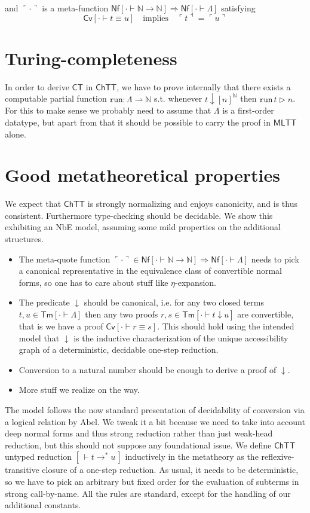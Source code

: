 \documentclass{article}
\newcommand{\MLTT}{\ensuremath{\mathsf{MLTT}}}
\newcommand{\CT}{\ensuremath{\mathsf{CT}}}
\newcommand{\CTTT}{\ensuremath{\mathsf{ChTT}}}
\newcommand{\Trm}[2]{\mathsf{Tm}[{{#1} \vdash {#2}}]}
\newcommand{\TNf}[2]{ {\mathsf{Nf}}[{{#1} \vdash {#2}}]}
\newcommand{\TEq}[3]{ {\mathsf{Cv}}[{{#1} \vdash {#2} \equiv {#3}}]}
\newcommand{\TRed}[2]{{[\, \vdash {#1} \longrightarrow^* {#2}\,]}}
\newcommand{\Code}{\Lambda}
\newcommand{\TNat}{\mathbb{N}}
\newcommand{\QNf}[1]{{\ulcorner{#1}\urcorner}}
\newcommand{\CRed}{\mathrel{\downarrow}}
\newcommand{\Reif}[2]{{[#1]}^{#2}}
\begin{document}
\noindent and $\QNf{\cdot}$ is a meta-function $\TNf{\cdot}{\TNat\rightarrow\TNat} \Rightarrow \TNf{\cdot}{\Code}$ satisfying
\[ \TEq{\cdot}{t}{u} \quad \text{implies}\quad \QNf{t} = \QNf{u} \]

\section{Turing-completeness}

In order to derive $\CT$ in $\CTTT$, we have to prove internally that there exists a computable partial function $\mathtt{run} : \Code \rightharpoonup \TNat$ s.t. whenever $t \CRed \Reif{n}{\TNat}$ then $\mathtt{run}\, t \rhd n$. For this to make sense we probably need to assume that $\Code$ is a first-order datatype, but apart from that it should be possible to carry the proof in $\MLTT$ alone. %

\section{Good metatheoretical properties}

We expect that $\CTTT$ is strongly normalizing and enjoys canonicity, and is thus consistent. Furthermore type-checking should be decidable. We show this exhibiting an NbE model, assuming some mild properties on the additional structures.

\begin{itemize}
 \item The meta-quote function $\QNf{\cdot} \in \TNf{\cdot}{\TNat\rightarrow\TNat} \Rightarrow \TNf{\cdot}{\Code}$ needs to pick a canonical representative in the equivalence class of convertible normal forms, so one has to care about stuff like $\eta$-expansion.
 \item The predicate $\CRed$ should be canonical, i.e. for any two closed terms $t, u \in \Trm{\cdot}{\Code}$ then any two proofs $r, s \in \Trm{\cdot}{t \CRed u}$ are convertible, that is we have a proof $\TEq{\cdot}{r}{s}$. This should hold using the intended model that $\CRed$ is the inductive characterization of the unique accessibility graph of a deterministic, decidable one-step reduction.
 \item Conversion to a natural number should be enough to derive a proof of $\CRed$.
 \item More stuff we realize on the way.
\end{itemize}

The model follows the now standard presentation of decidability of conversion via a logical relation by Abel. We tweak it a bit because we need to take into account deep normal forms and thus strong reduction rather than just weak-head reduction, but this should not suppose any foundational issue. We define $\CTTT$ untyped reduction $\TRed{t}{u}$ inductively in the metatheory as the reflexive-transitive closure of a one-step reduction. As usual, it needs to be deterministic, so we have to pick an arbitrary but fixed order for the evaluation of subterms in strong call-by-name. All the rules are standard, except for the handling of our additional constants.
\end{document}
